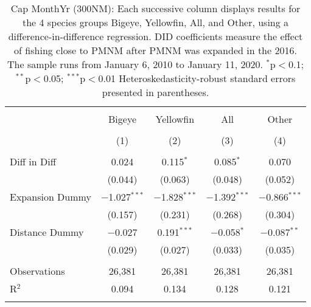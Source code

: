 
\begin{table}[!htbp] \centering 
  \caption{Cap MonthYr (300NM): Each successive column displays results for the 4 species groups Bigeye, Yellowfin, All, and Other, using a difference-in-difference regression. DID coefficients measure the effect of fishing close to PMNM after PMNM was expanded in the 2016. The sample runs from January 6, 2010 to January 11, 2020. $^{*}$p$<$0.1; $^{**}$p$<$0.05; $^{***}$p$<$0.01 Heteroskedasticity-robust standard errors presented in parentheses.} 
  \label{tbl:timeFE300NM} 
\begin{tabular}{@{\extracolsep{5pt}}lcccc} 
\\[-1.8ex]\hline 
\hline \\[-1.8ex] 
 & Bigeye & Yellowfin & All & Other \\ 
\\[-1.8ex] & (1) & (2) & (3) & (4)\\ 
\hline \\[-1.8ex] 
 Diff in Diff & 0.024 & 0.115$^{*}$ & 0.085$^{*}$ & 0.070 \\ 
  & (0.044) & (0.063) & (0.048) & (0.052) \\ 
  Expansion Dummy & $-$1.027$^{***}$ & $-$1.828$^{***}$ & $-$1.392$^{***}$ & $-$0.866$^{***}$ \\ 
  & (0.157) & (0.231) & (0.268) & (0.304) \\ 
  Distance Dummy & $-$0.027 & 0.191$^{***}$ & $-$0.058$^{*}$ & $-$0.087$^{**}$ \\ 
  & (0.029) & (0.027) & (0.033) & (0.035) \\ 
 \hline \\[-1.8ex] 
Observations & 26,381 & 26,381 & 26,381 & 26,381 \\ 
R$^{2}$ & 0.094 & 0.134 & 0.128 & 0.121 \\ 
\hline 
\hline \\[-1.8ex] 
\end{tabular} 
\end{table} 
